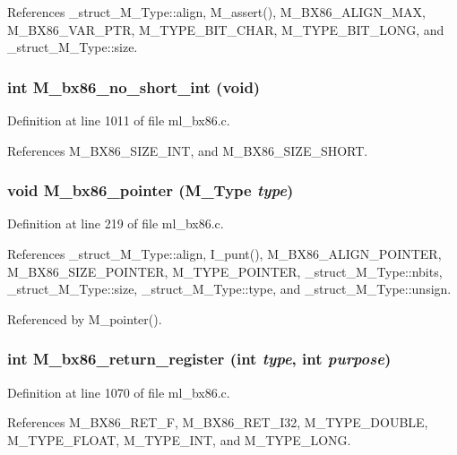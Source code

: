 References \_\-struct\_\-M\_\-Type::align, M\_\-assert(), M\_\-BX86\_\-ALIGN\_\-MAX, M\_\-BX86\_\-VAR\_\-PTR, M\_\-TYPE\_\-BIT\_\-CHAR, M\_\-TYPE\_\-BIT\_\-LONG, and \_\-struct\_\-M\_\-Type::size.
\subsubsection{\setlength{\rightskip}{0pt plus 5cm}int M\_\-bx86\_\-no\_\-short\_\-int (void)}\label{m__bx86_8h_12c526db476cda00f5443441116bce1b}




Definition at line 1011 of file ml\_\-bx86.c.

References M\_\-BX86\_\-SIZE\_\-INT, and M\_\-BX86\_\-SIZE\_\-SHORT.
\subsubsection{\setlength{\rightskip}{0pt plus 5cm}void M\_\-bx86\_\-pointer (\bf{M\_\-Type} {\em type})}\label{m__bx86_8h_563522254ad79091df4e089c239a47fb}




Definition at line 219 of file ml\_\-bx86.c.

References \_\-struct\_\-M\_\-Type::align, I\_\-punt(), M\_\-BX86\_\-ALIGN\_\-POINTER, M\_\-BX86\_\-SIZE\_\-POINTER, M\_\-TYPE\_\-POINTER, \_\-struct\_\-M\_\-Type::nbits, \_\-struct\_\-M\_\-Type::size, \_\-struct\_\-M\_\-Type::type, and \_\-struct\_\-M\_\-Type::unsign.

Referenced by M\_\-pointer().
\subsubsection{\setlength{\rightskip}{0pt plus 5cm}int M\_\-bx86\_\-return\_\-register (int {\em type}, int {\em purpose})}\label{m__bx86_8h_30d3e4d3819307a36b1b4df5e7e64c02}




Definition at line 1070 of file ml\_\-bx86.c.

References M\_\-BX86\_\-RET\_\-F, M\_\-BX86\_\-RET\_\-I32, M\_\-TYPE\_\-DOUBLE, M\_\-TYPE\_\-FLOAT, M\_\-TYPE\_\-INT, and M\_\-TYPE\_\-LONG.
